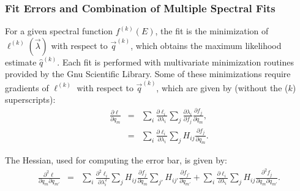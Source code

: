 \documentclass{article}    %
\begin{document}
\subsubsection{Fit Errors and Combination of Multiple Spectral Fits}

For a given spectral function $f^{(k)}(E)$, the fit is the
minimization of $\ell^{(k)}(\vec{\lambda})$ with respect to
$\vec{q}^{(k)}$, which obtains the maximum likelihood estimate
$\hat{q}^{(k)}$. Each fit is performed with multivariate minimization
routines provided by the Gnu Scientific Library. Some of these
minimizations require gradients of $\ell^{(k)}$ with respect to
$\vec{q}^{(k)}$, which are given by (without the ($k$) superscripts):
\begin{eqnarray}
\frac{\partial \ell}{\partial q_m} &=&
\sum_i \frac{\partial \ell_i}{\partial \lambda_i} \sum_j \frac{\partial\lambda_i }{\partial f_j} \frac{\partial f_j}{\partial q_m}, \nonumber \\
&=&
\sum_i \frac{\partial \ell_i}{\partial \lambda_i} \sum_j H_{ij} \frac{\partial f_j}{\partial q_m}.
\end{eqnarray}

The Hessian, used for computing the error bar, is given by:
\begin{eqnarray}
\frac{\partial^2 \ell}{\partial q_m \partial q_{m'}} &=&
\sum_i \frac{\partial^2 \ell_i}{\partial \lambda_i^2} \sum_j H_{ij} \frac{\partial f_j}{\partial q_m}\sum_{j'} H_{ij'} \frac{\partial f_{j'}}{\partial q_{m'}} +
\sum_i \frac{\partial \ell_i}{\partial \lambda_i} \sum_j H_{ij} \frac{\partial^2 f_j}{\partial q_m \partial q_{m'}}
.
\end{eqnarray}
\end{document}
